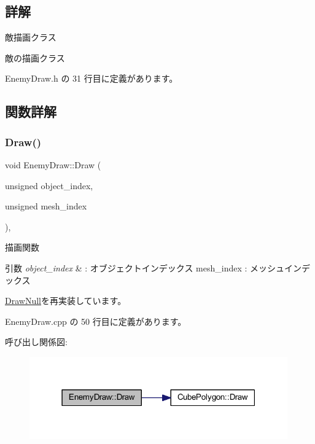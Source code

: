 \subsection{詳解}
敵描画クラス 

敵の描画クラス 

 Enemy\+Draw.\+h の 31 行目に定義があります。



\subsection{関数詳解}
\mbox{\label{class_enemy_draw_a20a23c1c5fd5e510d15e8ca27aabd821}} 
\subsubsection{\texorpdfstring{Draw()}{Draw()}}
{\footnotesize\ttfamily void Enemy\+Draw\+::\+Draw (\begin{DoxyParamCaption}\item[{unsigned}]{object\+\_\+index,  }\item[{unsigned}]{mesh\+\_\+index }\end{DoxyParamCaption})\hspace{0.3cm}{\ttfamily [override]}, {\ttfamily [virtual]}}



描画関数 


\begin{DoxyParams}{引数}
{\em object\+\_\+index} & \+: オブジェクトインデックス mesh\+\_\+index \+: メッシュインデックス \\
\hline
\end{DoxyParams}


\mbox{\hyperlink{class_draw_null_afe50f6fd820b18d673f70f048743f339}{Draw\+Null}}を再実装しています。



 Enemy\+Draw.\+cpp の 50 行目に定義があります。

呼び出し関係図\+:\nopagebreak
\begin{figure}[H]
\begin{center}
\leavevmode
\includegraphics[width=315pt]{class_enemy_draw_a20a23c1c5fd5e510d15e8ca27aabd821_cgraph}
\end{center}
\end{figure}
\mbox{\label{class_enemy_draw_a12f00116f7fa97e07317a949d5c27bb4}} 
